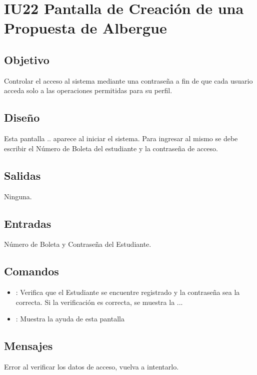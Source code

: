 \section{IU22 Pantalla de Creación de una Propuesta de Albergue}

\subsection{Objetivo}
	Controlar el acceso al sistema mediante una contraseña a fin de que cada usuario acceda solo a las operaciones permitidas para su perfil.

\subsection{Diseño}
	Esta pantalla .. aparece al iniciar el sistema. Para ingresar al mismo se debe escribir el Número de Boleta del estudiante y la contraseña de acceso. 

\subsection{Salidas}

	Ninguna.

\subsection{Entradas}
Número de Boleta y Contraseña del Estudiante.

\subsection{Comandos}
\begin{itemize}
	\item {}: Verifica que el Estudiante se encuentre registrado y la contraseña sea la correcta. Si la verificación es correcta, se muestra la ...
	\item {}: Muestra la ayuda de esta pantalla %
\end{itemize}

\subsection{Mensajes}

\begin{Citemize}
	\item Error al verificar los datos de acceso, vuelva a intentarlo.
\end{Citemize}

\clearpage